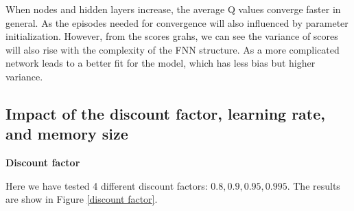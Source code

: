 \documentclass{article}
\begin{document}
When nodes and hidden layers increase, the average Q values converge faster in general. As the episodes
needed for convergence will also influenced by parameter initialization. However, from the scores grahs,
we can see the variance of scores will also rise with the complexity of the FNN structure. As a more
complicated network leads to a better fit for the model, which has less bias but higher variance.

\subsection{Impact of the discount factor, learning rate, and memory size}
\textbf{Discount factor}

Here we have tested 4 different discount factors: $0.8,0.9,0.95,0.995$. The results are show in Figure
\ref{discount factor}.
\end{document}
